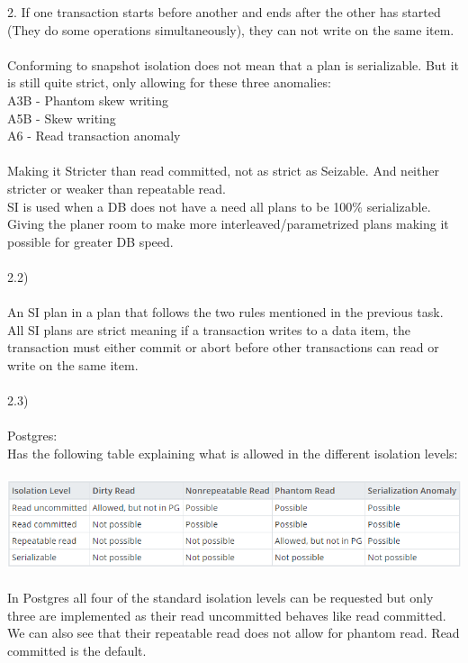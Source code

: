 \documentclass[12pt, letterpaper, twoside]{article}
\begin{document}
2. If one transaction starts before another and ends after the other has started (They do some operations simultaneously), they can not write on the same item.\\
\ \\
Conforming to snapshot isolation does not mean that a plan is serializable. But it is still quite strict, only allowing for these three anomalies:\\
A3B - Phantom skew writing\\
A5B - Skew writing\\
A6 - Read transaction anomaly\\
\ \\
Making it Stricter than read committed, not as strict as Seizable. And neither stricter or weaker than repeatable read.\\
SI is used when a DB does not have a need all plans to be 100\% serializable. Giving the planer room to make more interleaved/parametrized plans making it possible for greater DB speed.\\
\newpage
\ \\
2.2)\\
\ \\
An SI plan in a plan that follows the two rules mentioned in the previous task. All SI plans are strict meaning if a transaction writes to a data item, the transaction must either commit or abort before other transactions can read or write on the same item.\\
\ \\
2.3)\\
\ \\
Postgres:\\
Has the following table explaining what is allowed in the different isolation levels:\\
\ \\
\includegraphics[scale=0.75]{"PG.png"}
\ \\
In Postgres all four of the standard isolation levels can be requested but only three are implemented as their read uncommitted behaves like read committed. We can also see that their repeatable read does not allow for phantom read. Read committed is the default.\\
\ \\
\end{document}
